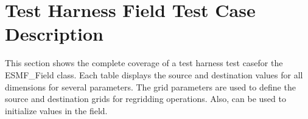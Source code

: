 \section{Test Harness Field Test Case Description}
This section shows the complete coverage of a test harness test casefor the ESMF\_Field class. 
Each table displays the source and destination values for all dimensions for several parameters.  
The grid parameters are used to define the source and destination grids for regridding operations.
Also, can be used to initialize values in the field.  \\


